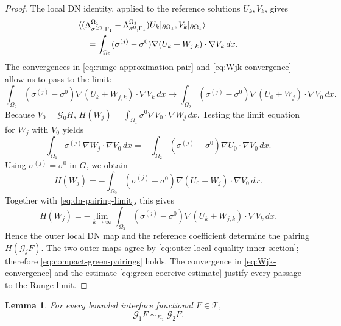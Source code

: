 \documentclass[11pt,oneside]{article}
\newtheorem{lemma}[theorem]{Lemma}
\newcommand{\DN}{\Lambda}
\begin{document}
\begin{proof}
The local DN identity, applied to the reference solutions \(U_k,V_k\), gives
\begin{align}
 &\langle
 (\DN^{\Omega_1}_{\sigma^{(j)},\Gamma_1}
  -\DN^{\Omega_1}_{\sigma^0,\Gamma_1})
      U_k|_{\partial\Omega_1},V_k|_{\partial\Omega_1}\rangle
      \notag\\
 &\quad =
  \int_{\Omega_2}(\sigma^{(j)}-\sigma^0)
    \nabla (U_k+W_{j,k})\cdot\nabla V_k\,dx .
  \label{eq:dn-difference-pairing}
\end{align}
The convergences in \eqref{eq:runge-approximation-pair} and
\eqref{eq:Wjk-convergence} allow us to pass to the limit:
\begin{equation}
  \int_{\Omega_2}(\sigma^{(j)}-\sigma^0)
    \nabla (U_k+W_{j,k})\cdot\nabla V_k\,dx
  \longrightarrow
  \int_{\Omega_2}(\sigma^{(j)}-\sigma^0)
    \nabla (U_0+W_j)\cdot\nabla V_0\,dx .
  \label{eq:dn-pairing-limit}
\end{equation}
Because \(V_0=\mathcal G_0H\),
\(H(W_j)=\int_{\Omega_1}\sigma^0\nabla V_0\cdot\nabla W_j\,dx\).  Testing the
limit equation for \(W_j\) with \(V_0\) yields
\begin{equation}
  \int_{\Omega_1}\sigma^{(j)}\nabla W_j\cdot\nabla V_0\,dx
  =-\int_{\Omega_2}(\sigma^{(j)}-\sigma^0)
    \nabla U_0\cdot\nabla V_0\,dx .
\end{equation}
Using \(\sigma^{(j)}=\sigma^0\) in \(G\), we obtain
\begin{equation}
  H(W_j)
  =-\int_{\Omega_2}(\sigma^{(j)}-\sigma^0)
    \nabla (U_0+W_j)\cdot\nabla V_0\,dx .
\end{equation}
Together with \eqref{eq:dn-pairing-limit}, this gives
\begin{equation}
  H(W_j)
  =-\lim_{k\to\infty}
  \int_{\Omega_2}(\sigma^{(j)}-\sigma^0)
    \nabla (U_k+W_{j,k})\cdot\nabla V_k\,dx .
  \label{eq:green-pairing-from-dn}
\end{equation}
Hence the outer local DN map and the reference coefficient determine the
pairing \(H(\mathcal G_jF)\).  The two outer maps agree by
\eqref{eq:outer-local-equality-inner-section}; therefore
\eqref{eq:compact-green-pairings} holds.  The convergence in
\eqref{eq:Wjk-convergence} and the estimate
\eqref{eq:green-coercive-estimate} justify every passage to the Runge limit.
\end{proof}

\begin{lemma}
\label{lem:green-trace-relation}
For every bounded interface functional \(F\in\mathcal T\),
\begin{equation}
  \mathcal G_1F\sim_{\Sigma_2}\mathcal G_2F.
  \label{eq:green-traces-equal}
\end{equation}
\end{lemma}
\end{document}
